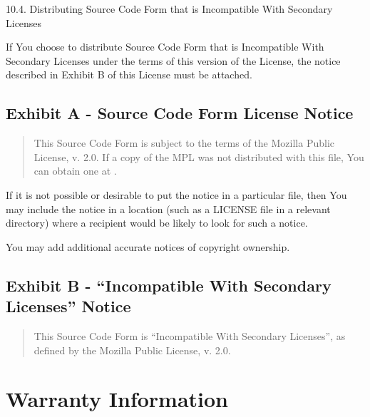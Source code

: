 \documentclass[letterpaper,10pt,english]{sphinxmanual}
\begin{document}
10.4. Distributing Source Code Form that is Incompatible With Secondary
Licenses

If You choose to distribute Source Code Form that is Incompatible With
Secondary Licenses under the terms of this version of the License, the
notice described in Exhibit B of this License must be attached.


\subsection{Exhibit A - Source Code Form License Notice}
\label{\detokenize{warranty:exhibit-a-source-code-form-license-notice}}\begin{quote}

This Source Code Form is subject to the terms of the Mozilla Public
License, v. 2.0. If a copy of the MPL was not distributed with this
file, You can obtain one at .
\end{quote}

If it is not possible or desirable to put the notice in a particular
file, then You may include the notice in a location (such as a LICENSE
file in a relevant directory) where a recipient would be likely to look
for such a notice.

You may add additional accurate notices of copyright ownership.


\subsection{Exhibit B - “Incompatible With Secondary Licenses” Notice}
\label{\detokenize{warranty:exhibit-b-incompatible-with-secondary-licenses-notice}}\begin{quote}

This Source Code Form is “Incompatible With Secondary Licenses”, as
defined by the Mozilla Public License, v. 2.0.
\end{quote}


\section{Warranty Information}
\label{\detokenize{warranty:warranty-information}}
\end{document}
